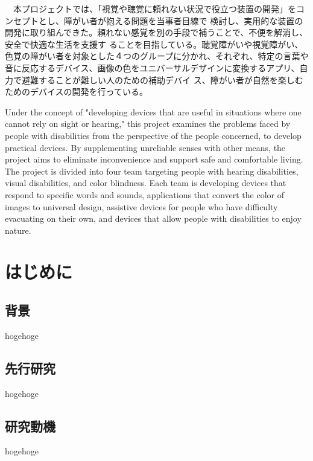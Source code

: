 \documentclass[12pt,a4paper]{report}
\begin{document}
{
    \centerline{
      \huge{}
    }
    \vspace{1cm}
    \noindent
    　本プロジェクトでは、「視覚や聴覚に頼れない状況で役立つ装置の開発」をコンセプトとし、障がい者が抱える問題を当事者目線で
検討し、実用的な装置の開発に取り組んできた。頼れない感覚を別の手段で補うことで、不便を解消し、安全で快適な生活を支援す
ることを目指している。聴覚障がいや視覚障がい、色覚の障がい者を対象とした４つのグループに分かれ、それぞれ、特定の言葉や
音に反応するデバイス、画像の色をユニバーサルデザインに変換するアプリ、自力で避難することが難しい人のための補助デバイ
ス、障がい者が自然を楽しむためのデバイスの開発を行っている。

}
\newpage
{
    \centerline{
      \textbf{\huge{}}
    }
    \vspace{1cm}
    \noindent
    \space Under the concept of "developing devices that are useful in situations where one cannot rely on sight or hearing," this project examines the
problems faced by people with disabilities from the perspective of the people concerned, to develop practical devices. By supplementing
unreliable senses with other means, the project aims to eliminate inconvenience and support safe and comfortable living. The project is
divided into four team targeting people with hearing disabilities, visual disabilities, and color blindness. Each team is developing devices that
respond to specific words and sounds, applications that convert the color of images to universal design, assistive devices for people who
have difficulty evacuating on their own, and devices that allow people with disabilities to enjoy nature.

}
\newpage

\tableofcontents
\newpage

\chapter{はじめに}
\section{背景}
\noindent
hogehoge
\section{先行研究}
\noindent
hogehoge
\section{研究動機}
\noindent
hogehoge
\end{document}

